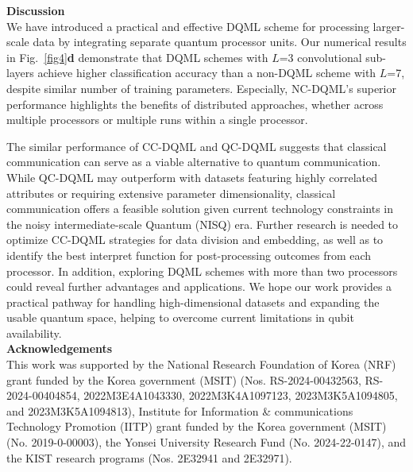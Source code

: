 \documentclass[aps,prx,reprint,amsmath,amssymb,superscriptaddress,nobibnotes,showpacs]{revtex4-2}
\begin{document}






\noindent\textbf{Discussion}\\
We have introduced a practical and effective DQML scheme for processing larger-scale data by integrating separate quantum processor units. Our numerical results in Fig.~\ref{fig4}\textbf{d} demonstrate that DQML schemes with $L$=3 convolutional sub-layers achieve higher classification accuracy than a non-DQML scheme with $L$=7, despite similar number of training parameters. Especially, NC-DQML's superior performance highlights the benefits of distributed approaches, whether across multiple processors or multiple runs within a single processor.

The similar performance of CC-DQML and QC-DQML suggests that classical communication can serve as a viable alternative to quantum communication. While QC-DQML may outperform with datasets featuring highly correlated attributes or requiring extensive parameter dimensionality, classical communication offers a feasible solution given current technology constraints in the noisy intermediate-scale Quantum (NISQ) era. Further research is needed to optimize CC-DQML strategies for data division and embedding, as well as to identify the best interpret function for post-processing outcomes from each processor. In addition, exploring DQML schemes with more than two processors could reveal further advantages and applications. We hope our work provides a practical pathway for handling high-dimensional datasets and expanding the usable quantum space, helping to overcome current limitations in qubit availability.\\

\noindent\textbf{Acknowledgements}\\
This work was supported by the National Research Foundation of Korea (NRF) grant funded by the Korea government (MSIT) (Nos. RS-2024-00432563, RS-2024-00404854, 2022M3E4A1043330, 2022M3K4A1097123, 2023M3K5A1094805, and 2023M3K5A1094813), Institute for Information \& communications Technology Promotion (IITP) grant funded by the Korea government (MSIT) (No. 2019-0-00003), the Yonsei University Research Fund (No. 2024-22-0147), and the KIST research programs (Nos. 2E32941 and 2E32971). 
\end{document}
